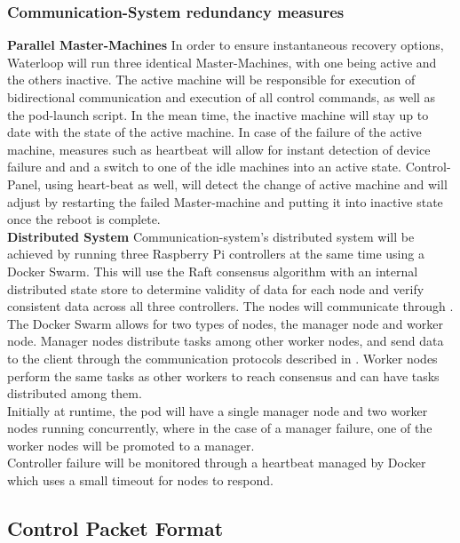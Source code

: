 \subsubsection{Communication-System redundancy measures}
\qquad\textbf{Parallel Master-Machines} In order to ensure instantaneous recovery options, Waterloop will run three identical Master-Machines, with one being active and the others inactive. The active machine will be responsible for execution of bidirectional communication and execution of all control commands, as well as the pod-launch script. In the mean time, the inactive machine will stay up to date with the state of the active machine. In case of the failure of the active machine, measures such as heartbeat will allow for instant detection of device failure and and a switch to one of the idle machines into an active state. Control-Panel, using heart-beat as well, will detect the change of active machine and will adjust by restarting the failed Master-machine and putting it into inactive state once the reboot is complete.\\

\textbf{Distributed System} Communication-system's distributed system will be achieved by running three Raspberry Pi controllers at the same time using a Docker Swarm. This will use the Raft consensus algorithm with an internal distributed state store to determine validity of data for each node and verify consistent data across all three controllers. The nodes will communicate through \itc.\\
    The Docker Swarm allows for two types of nodes, the manager node and worker node. Manager nodes distribute tasks among other worker nodes, and send data to the client through the communication protocols described in . Worker nodes perform the same tasks as other workers to reach consensus and can have tasks distributed among them.\\
    Initially at runtime, the pod will have a single manager node and two worker nodes running concurrently, where in the case of a manager failure, one of the worker nodes will be promoted to a manager.\\
    Controller failure will be monitored through a heartbeat managed by Docker which uses a small timeout for nodes to respond.
    
\subsection{Control Packet Format}
